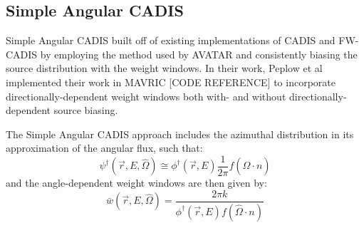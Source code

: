 \subsection{Simple Angular CADIS}

Simple Angular CADIS \cite{peplow_consistent_2012} built off of existing implementations
of CADIS and FW-CADIS by employing the method used by AVATAR and consistently biasing the
source distribution with the weight windows. In their work, Peplow et al implemented their
work in MAVRIC [CODE REFERENCE] to incorporate directionally-dependent weight windows
both with- and without directionally-dependent source biasing.

The Simple Angular CADIS approach includes the azimuthal distribution in its approximation
of the angular flux, such that:
\begin{equation}
\psi^{\dagger}(\vec{r}, E, \hat \Omega) \cong \phi^{\dagger}(\vec{r}, E) \frac{1}{2\pi} f(\hat\Omega \cdot n)
\end{equation}
and the angle-dependent weight windows are then given by:
\begin{equation}
\bar {w} (\vec{r},E,\hat\Omega) = \frac{2 \pi k}{\phi^{\dagger}(\vec{r},E)
                                  f(\hat\Omega \cdot n)}
\end{equation}

